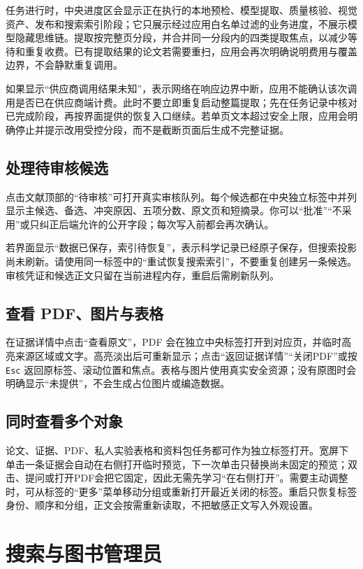 \documentclass[11pt,a4paper]{ctexart}
\begin{document}
任务进行时，中央进度区会显示正在执行的本地预检、模型提取、质量核验、视觉资产、发布和搜索索引阶段；它只展示经过应用白名单过滤的业务进度，不展示模型隐藏思维链。提取按完整页分段，并合并同一分段内的四类提取焦点，以减少等待和重复收费。已有提取结果的论文若需要重扫，应用会再次明确说明费用与覆盖边界，不会静默重复调用。

如果显示“供应商调用结果未知”，表示网络在响应边界中断，应用不能确认该次调用是否已在供应商端计费。此时不要立即重复启动整篇提取；先在任务记录中核对已完成阶段，再按界面提供的恢复入口继续。若单页文本超过安全上限，应用会明确停止并提示改用受控分段，而不是截断页面后生成不完整证据。

\subsection{处理待审核候选}

点击文献顶部的“待审核”可打开真实审核队列。每个候选都在中央独立标签中并列显示主候选、备选、冲突原因、五项分数、原文页和短摘录。你可以“批准”“不采用”或只纠正后端允许的公开字段；每次写入前都会再次确认。

若界面显示“数据已保存，索引待恢复”，表示科学记录已经原子保存，但搜索投影尚未刷新。请使用同一标签中的“重试恢复搜索索引”，不要重复创建另一条候选。审核凭证和候选正文只留在当前进程内存，重启后需刷新队列。

\subsection{查看 PDF、图片与表格}

在证据详情中点击“查看原文”，PDF 会在独立中央标签打开到对应页，并临时高亮来源区域或文字。高亮淡出后可重新显示；点击“返回证据详情”“关闭PDF”或按 \texttt{Esc} 返回原标签、滚动位置和焦点。表格与图片使用真实安全资源；没有原图时会明确显示“未提供”，不会生成占位图片或编造数据。

\subsection{同时查看多个对象}

论文、证据、PDF、私人实验表格和资料包任务都可作为独立标签打开。宽屏下单击一条证据会自动在右侧打开临时预览，下一次单击只替换尚未固定的预览；双击、提问或打开PDF会把它固定，因此无需先学习“在右侧打开”。需要主动调整时，可从标签的“更多”菜单移动分组或重新打开最近关闭的标签。重启只恢复标签身份、顺序和分组，正文会按需重新读取，不把敏感正文写入外观设置。

\section{搜索与图书管理员}
\end{document}
